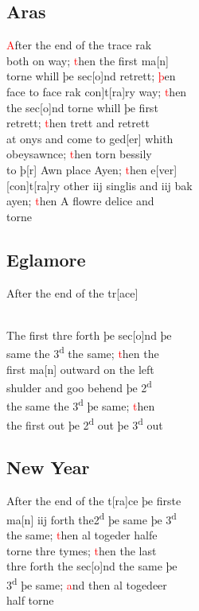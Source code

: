\documentclass[12pt,letter]{article} %
\newcommand{\red}[1]{\textcolor{red}{#1}}
\newcommand{\srcpg}[1]{
    \noindent{
        \color{Gray}{\rule[0.5ex]{\linewidth}{1pt}~#1} 
    
    }
}
\begin{document}
\subsection{Aras}
\red{A}fter the end of the trace rak\\
both on way; \red{t}hen the first ma{[}n{]}\\
torne whill þe sec{[}o{]}nd retrett; \red{þ}en\\
face to face rak \marginnote{2}{[}con{]}t{[}ra{]}ry way; \red{t}hen\\
the sec{[}o{]}nd torne whill þe first\\
retrett; \red{t}hen trett and retrett\\
at onys and come to ged{[}er{]} whith\\
obeysawnce; \red{t}hen torn bessily\\
to þ{[}r{]} Awn place Ayen; \red{t}hen e{[}ver{]}\\
{[}con{]}t{[}ra{]}ry other iij singlis and iij bak\\
ayen; \red{t}hen A flowre delice and\\
torne

\subsection{Eglamore}
After the end of the tr{[}ace{]} 
\\ \ 
\srcpg{65}
The first thre forth þe sec{[}o{]}nd þe\\
same the 3\textsuperscript{d} the same; \red{t}hen the\\
first ma{[}n{]} outward on the left\\
shulder and goo behend þe 2\textsuperscript{d}\\
the same the 3\textsuperscript{d} þe same; \red{t}hen\\
the first out þe 2\textsuperscript{d} out þe 3\textsuperscript{d} out

\subsection{New Year}
After the end of the t{[}ra{]}ce þe firste\\
ma{[}n{]} iij forth the2\textsuperscript{d} þe same þe 3\textsuperscript{d}\\
the same; \red{t}hen al togeder halfe\\
 torne thre tymes; \red{t}hen the last\\
thre forth the sec{[}o{]}nd the same þe\\
3\textsuperscript{d} þe same; \red{a}nd then al togedeer\\
half torne
\end{document}
